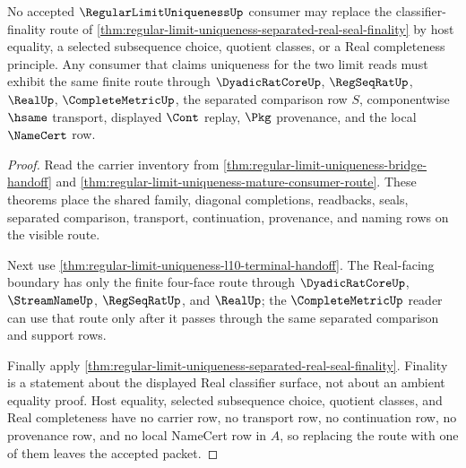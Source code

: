 \begin{theorem}
\label{thm:regular-limit-uniqueness-classifier-choice-free-nonescape}
No accepted $\RegularLimitUniquenessUp$ consumer may replace the classifier-finality route of \autoref{thm:regular-limit-uniqueness-separated-real-seal-finality} by host equality, a selected subsequence choice, quotient classes, or a Real completeness principle. Any consumer that claims uniqueness for the two limit reads must exhibit the same finite route through $\DyadicRatCoreUp$, $\RegSeqRatUp$, $\RealUp$, $\CompleteMetricUp$, the separated comparison row $S$, componentwise $\hsame$ transport, displayed $\Cont$ replay, $\Pkg$ provenance, and the local $\NameCert$ row.
\end{theorem}
\begin{proof}
Read the carrier inventory from \autoref{thm:regular-limit-uniqueness-bridge-handoff} and \autoref{thm:regular-limit-uniqueness-mature-consumer-route}. These theorems place the shared family, diagonal completions, readbacks, seals, separated comparison, transport, continuation, provenance, and naming rows on the visible route.

Next use \autoref{thm:regular-limit-uniqueness-l10-terminal-handoff}. The Real-facing boundary has only the finite four-face route through $\DyadicRatCoreUp$, $\StreamNameUp$, $\RegSeqRatUp$, and $\RealUp$; the $\CompleteMetricUp$ reader can use that route only after it passes through the same separated comparison and support rows.

Finally apply \autoref{thm:regular-limit-uniqueness-separated-real-seal-finality}. Finality is a statement about the displayed Real classifier surface, not about an ambient equality proof. Host equality, selected subsequence choice, quotient classes, and Real completeness have no carrier row, no transport row, no continuation row, no provenance row, and no local NameCert row in $A$, so replacing the route with one of them leaves the accepted packet.
\end{proof}


